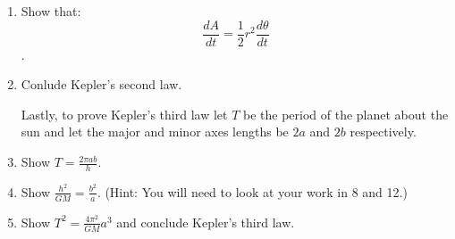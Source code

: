 \documentclass[11pt]{article}
\begin{document}
\begin{enumerate}
\item Show that: $$ \frac{dA}{dt} = \frac{1}{2} r^2 \frac{d\theta}{dt}$$.


\item Conlude Kepler's second law.

 Lastly, to prove Kepler's third law let $T$ be the period of the planet about the sun and let the major and minor axes lengths be $2a$ and $2b$ respectively.

\item Show $\displaystyle T = \frac{2\pi a b }{h}$.

\item Show $\displaystyle \frac{h^2}{GM} = \frac{b^2}{a}$. (Hint: You will need to look at your work in 8 and 12.)

\item Show $\displaystyle T^2 = \frac{4\pi^2}{GM} a^3$ and conclude Kepler's third law.

\end{enumerate}
\end{document}
